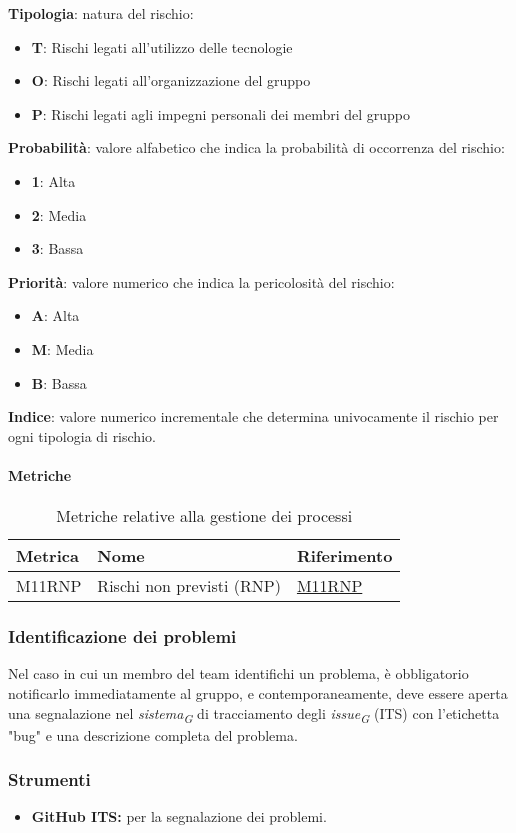 \begin{flushleft}
    \textbf{Tipologia}: natura del rischio:
    \begin{itemize}
        \item \textbf{T}: Rischi legati all'utilizzo delle tecnologie 
        \item \textbf{O}: Rischi legati all'organizzazione del gruppo 
        \item \textbf{P}: Rischi legati agli impegni personali dei membri del gruppo 
    \end{itemize}
    \textbf{Probabilità}: valore alfabetico che indica la probabilità di occorrenza del rischio: 
    \begin{itemize}
        \item \textbf{1}: Alta 
        \item \textbf{2}: Media 
        \item \textbf{3}: Bassa 
    \end{itemize}
    \textbf{Priorità}: valore numerico che indica la pericolosità del rischio:
    \begin{itemize}
        \item \textbf{A}: Alta
        \item \textbf{M}: Media  
        \item \textbf{B}: Bassa 
    \end{itemize}
    \textbf{Indice}: valore numerico incrementale che determina univocamente il rischio per ogni tipologia di rischio.  
\end{flushleft}

\paragraph{Metriche}
\begin{table}[H]
  \centering
  \begin{tabular}{|C{3cm}|C{3cm}|C{4cm}|}
  \hline
  Metrica & Nome & Riferimento \\
  \hline \hline
  M11RNP & Rischi non previsti (RNP) &  \hyperlink{item:M11RNP}{\textcolor{linkcolor}{M11RNP}}\\ 
  \hline
  \end{tabular}
  \caption{Metriche relative alla gestione dei processi}
\end{table}

\subsubsection{Identificazione dei problemi}
Nel caso in cui un membro del team identifichi un problema, è obbligatorio notificarlo immediatamente al gruppo, e contemporaneamente, deve essere aperta una segnalazione nel \textit{sistema}\textsubscript{\textit{G}} di tracciamento degli \textit{issue}\textsubscript{\textit{G}} (ITS) con l'etichetta "bug" e una descrizione completa del problema.

\subsubsection{Strumenti}
\begin{itemize}
    \item \textbf{GitHub ITS:} 
        per la segnalazione dei problemi. 
\end{itemize}